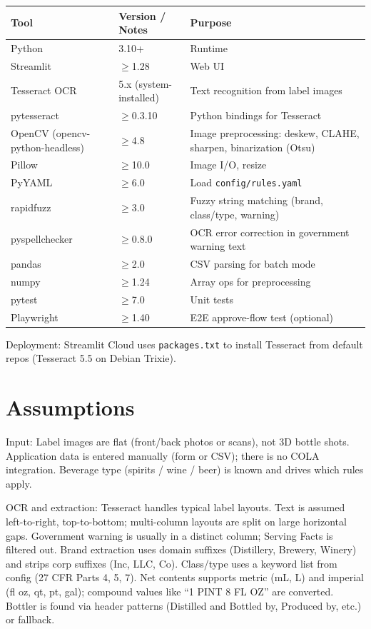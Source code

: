 \documentclass[11pt,a4paper]{article}
\begin{document}
\begin{table}[h]
\centering
\small
\begin{tabularx}{\textwidth}{@{}l l X@{}}
\toprule
\textbf{Tool} & \textbf{Version / Notes} & \textbf{Purpose} \\
\midrule
Python & 3.10+ & Runtime \\
Streamlit & $\geq$1.28 & Web UI \\
Tesseract OCR & 5.x (system-installed) & Text recognition from label images \\
pytesseract & $\geq$0.3.10 & Python bindings for Tesseract \\
OpenCV (opencv-python-headless) & $\geq$4.8 & Image preprocessing: deskew, CLAHE, sharpen, binarization (Otsu) \\
Pillow & $\geq$10.0 & Image I/O, resize \\
PyYAML & $\geq$6.0 & Load \texttt{config/rules.yaml} \\
rapidfuzz & $\geq$3.0 & Fuzzy string matching (brand, class/type, warning) \\
pyspellchecker & $\geq$0.8.0 & OCR error correction in government warning text \\
pandas & $\geq$2.0 & CSV parsing for batch mode \\
numpy & $\geq$1.24 & Array ops for preprocessing \\
pytest & $\geq$7.0 & Unit tests \\
Playwright & $\geq$1.40 & E2E approve-flow test (optional) \\
\bottomrule
\end{tabularx}
\end{table}

Deployment: Streamlit Cloud uses \texttt{packages.txt} to install Tesseract from default repos (Tesseract 5.5 on Debian Trixie).

\section{Assumptions}

Input: Label images are flat (front/back photos or scans), not 3D bottle shots. Application data is entered manually (form or CSV); there is no COLA integration. Beverage type (spirits / wine / beer) is known and drives which rules apply.

OCR and extraction: Tesseract handles typical label layouts. Text is assumed left-to-right, top-to-bottom; multi-column layouts are split on large horizontal gaps. Government warning is usually in a distinct column; Serving Facts is filtered out. Brand extraction uses domain suffixes (Distillery, Brewery, Winery) and strips corp suffixes (Inc, LLC, Co). Class/type uses a keyword list from config (27 CFR Parts 4, 5, 7). Net contents supports metric (mL, L) and imperial (fl oz, qt, pt, gal); compound values like ``1 PINT 8 FL OZ'' are converted. Bottler is found via header patterns (Distilled and Bottled by, Produced by, etc.) or fallback.
\end{document}
